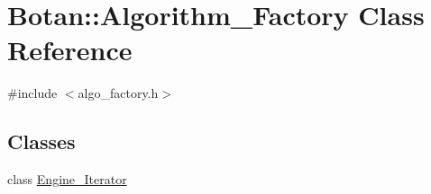\hypertarget{classBotan_1_1Algorithm__Factory}{\section{Botan\-:\-:Algorithm\-\_\-\-Factory Class Reference}
\label{classBotan_1_1Algorithm__Factory}
}


{\ttfamily \#include $<$algo\-\_\-factory.\-h$>$}

\subsection*{Classes}
\begin{DoxyCompactItemize}
\item 
class \hyperlink{classBotan_1_1Algorithm__Factory_1_1Engine__Iterator}{Engine\-\_\-\-Iterator}
\end{DoxyCompactItemize}
